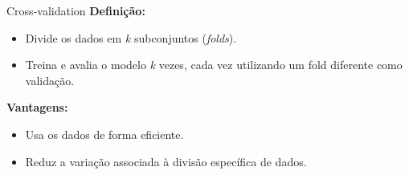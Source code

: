 \documentclass{beamer}
\begin{document}
\begin{frame}{Cross-validation}
    \textbf{Definição:}
    \begin{itemize}
        \item Divide os dados em \textit{k} subconjuntos (\textit{folds}).
        \item Treina e avalia o modelo \textit{k} vezes, cada vez utilizando um fold diferente como validação.
    \end{itemize}

    \vspace{0.5cm}
    \textbf{Vantagens:}
    \begin{itemize}
        \item Usa os dados de forma eficiente.
        \item Reduz a variação associada à divisão específica de dados.
    \end{itemize}
\end{frame}
\end{document}

